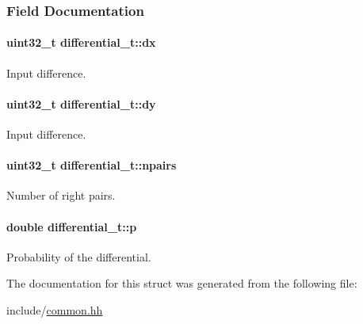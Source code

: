 \subsubsection{\-Field \-Documentation}
\hypertarget{structdifferential__t_a7c8d9c03f003718151366dc20ebc926d}{
\paragraph[{dx}]{\setlength{\rightskip}{0pt plus 5cm}uint32\-\_\-t {\bf differential\-\_\-t\-::dx}}}\label{structdifferential__t_a7c8d9c03f003718151366dc20ebc926d}
\-Input difference. \hypertarget{structdifferential__t_a23f60e1aeb235ff165e156837a7fcf0c}{
\paragraph[{dy}]{\setlength{\rightskip}{0pt plus 5cm}uint32\-\_\-t {\bf differential\-\_\-t\-::dy}}}\label{structdifferential__t_a23f60e1aeb235ff165e156837a7fcf0c}
\-Input difference. \hypertarget{structdifferential__t_a48749d47f65b26bca18b5f43e992cc51}{
\paragraph[{npairs}]{\setlength{\rightskip}{0pt plus 5cm}uint32\-\_\-t {\bf differential\-\_\-t\-::npairs}}}\label{structdifferential__t_a48749d47f65b26bca18b5f43e992cc51}
\-Number of right pairs. \hypertarget{structdifferential__t_a6e5754b351ad57c5ff8a626521a5c67a}{
\paragraph[{p}]{\setlength{\rightskip}{0pt plus 5cm}double {\bf differential\-\_\-t\-::p}}}\label{structdifferential__t_a6e5754b351ad57c5ff8a626521a5c67a}
\-Probability of the differential. 

\-The documentation for this struct was generated from the following file\-:\begin{DoxyCompactItemize}
\item 
include/\hyperlink{common_8hh}{common.\-hh}\end{DoxyCompactItemize}
